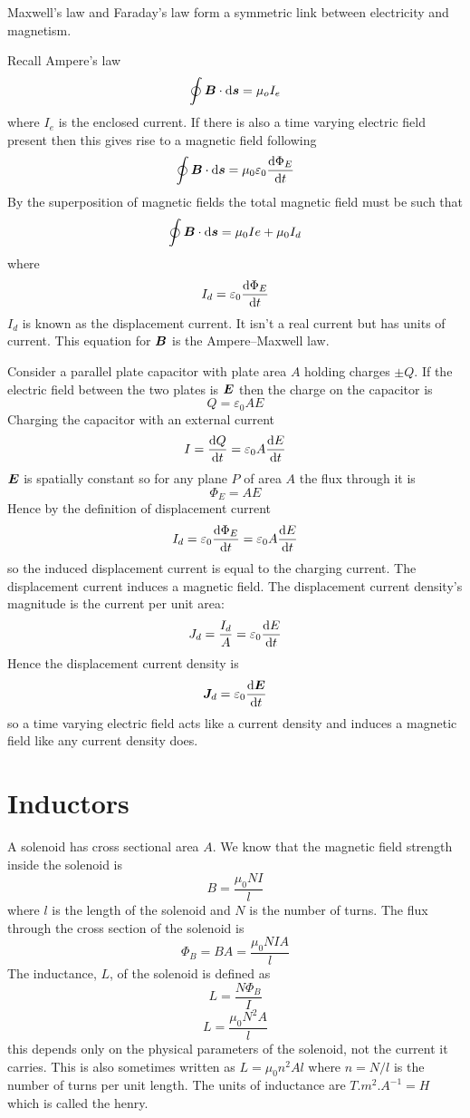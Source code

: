 \documentclass{article}
\begin{document}
    Maxwell's law and Faraday's law form a symmetric link between electricity and magnetism.
    
    Recall Ampere's law
    \[\oint \bm{B}\cdot\dd\bm{s} = \mu_o I_e\]
    where \(I_e\) is the enclosed current.
    If there is also a time varying electric field present then this gives rise to a magnetic field following
    \[\oint \bm{B}\cdot\dd\bm{s} = \mu_0\varepsilon_0\dv{\Phi_E}{t}\]
    By the superposition of magnetic fields the total magnetic field must be such that
    \[\oint\bm{B}\cdot\dd\bm{s} = \mu_0 I e + \mu_0 I_d\]
    where
    \[I_d = \varepsilon_0\dv{\Phi_E}{t}\]
    \(I_d\) is known as the displacement current.
    It isn't a real current but has units of current.
    This equation for \(\bm{B}\) is the Ampere--Maxwell law.
    
    Consider a parallel plate capacitor with plate area \(A\) holding charges \(\pm Q\).
    If the electric field between the two plates is \(\bm{E}\) then the charge on the capacitor is
    \[Q = \varepsilon_0 AE\]
    Charging the capacitor with an external current
    \[I = \dv{Q}{t} = \varepsilon_0 A\dv{E}{t}\]
    \(\bm{E}\) is spatially constant so for any plane \(P\) of area \(A\) the flux through it is
    \[\Phi_E = AE\]
    Hence by the definition of displacement current
    \[I_d = \varepsilon_0\dv{\Phi_E}{t} = \varepsilon_0 A\dv{E}{t}\]
    so the induced displacement current is equal to the charging current.
    The displacement current induces a magnetic field.
    The displacement current density's magnitude is the current per unit area:
    \[J_d = \frac{I_d}{A} = \varepsilon_0\dv{E}{t}\]
    Hence the displacement current density is
    \[\bm{J}_d = \varepsilon_0\dv{\bm{E}}{t}\]
    so a time varying electric field acts like a current density and induces a magnetic field like any current density does.
    
    \section{Inductors}
    A solenoid has cross sectional area \(A\).
    We know that the magnetic field strength inside the solenoid is
    \[B = \frac{\mu_0NI}{l}\]
    where \(l\) is the length of the solenoid and \(N\) is the number of turns.
    The flux through the cross section of the solenoid is
    \[\Phi_B = BA = \frac{\mu_0NIA}{l}\]
    The inductance, \(L\), of the solenoid is defined as
    \[L = \frac{N\Phi_B}{I}\]
    \[L = \frac{\mu_0N^2A}{l}\]
    this depends only on the physical parameters of the solenoid, not the current it carries.
    This is also sometimes written as \(L = \mu_0n^2Al\) where \(n = N/l\) is the number of turns per unit length.
    The units of inductance are \(\si{T.m^2.A^{-1}} = \si{H}\) which is called the henry.
    
\end{document}

